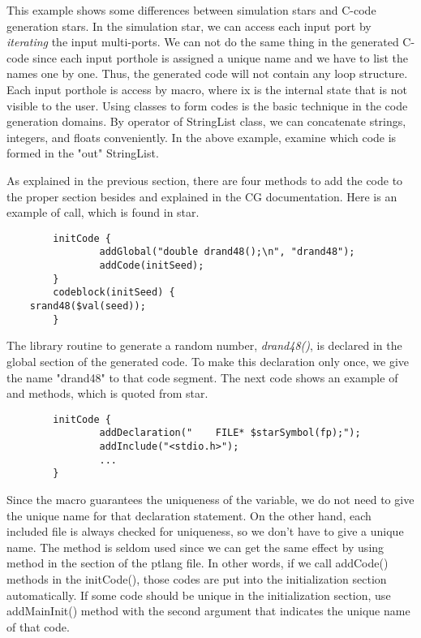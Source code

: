\begin{ignore}
This example shows some differences between simulation stars and 
C-code generation stars. In the simulation star, we can access
each input port by \emph{iterating} the input multi-ports. We can not
do the same thing in the generated C-code since each input porthole
is assigned a unique name and we have to list the names one by one.
Thus, the generated code will not contain any loop structure.
Each input porthole is access by 
macro, where ix is the internal state that is not visible to the
user. Using 
classes to form codes is the basic technique in the code generation domains.
By 
operator of StringList class, we can concatenate strings, integers,
and floats conveniently. In the above example, examine
which code is formed in the "out" StringList.

As explained in the previous section, there are four methods to add
the code to the proper section besides 
and 
explained in the CG documentation.
Here is an example of 
call, which is found in 
star.

\begin{verbatim}
        initCode {
                addGlobal("double drand48();\n", "drand48");
                addCode(initSeed);
        }
        codeblock(initSeed) {
    srand48($val(seed));
        }
\end{verbatim}

The library routine to generate a random number, \emph{drand48()},
is declared in the global section of the generated code. To
make this declaration only once, we give the name "drand48" to
that code segment. The next code shows an example of 
and 
methods, which is quoted from 
star.

\begin{verbatim}
        initCode {
                addDeclaration("    FILE* $starSymbol(fp);");
                addInclude("<stdio.h>");
                ...
        }
\end{verbatim}

Since the
macro guarantees the uniqueness of the variable, we do not need to
give the unique name for that declaration statement. On the other
hand, each included file is always checked for uniqueness, so we don't
have to give a unique name. The 
method is seldom used since we can get the same effect by using
method in the 
section of the ptlang file. In other words, if we call addCode()
methods in the initCode(), those codes  are put into the
initialization section automatically. If some code should be unique
in the initialization section, use addMainInit() method with the
second argument that indicates the unique name of that code.


\end{ignore}
